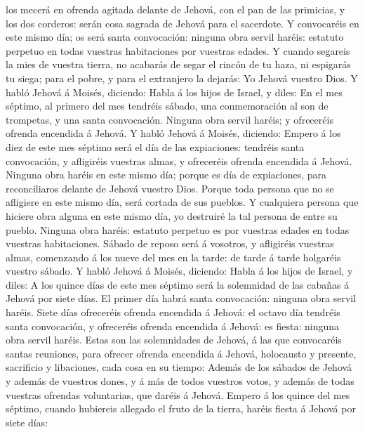 los mecerá en ofrenda agitada delante de Jehová, con el pan de las
primicias, y los dos corderos: serán cosa sagrada de Jehová para el
sacerdote.  Y convocaréis en este mismo día; os será santa
convocación: ninguna obra servil haréis: estatuto perpetuo en todas
vuestras habitaciones por vuestras edades.  Y cuando
segareis la mies de vuestra tierra, no acabarás de segar el rincón de tu
haza, ni espigarás tu siega; para el pobre, y para el extranjero la
dejarás: Yo Jehová vuestro Dios.  Y habló Jehová á Moisés,
diciendo:  Habla á los hijos de Israel, y diles: En el mes
séptimo, al primero del mes tendréis sábado, una conmemoración al son de
trompetas, y una santa convocación.  Ninguna obra servil
haréis; y ofreceréis ofrenda encendida á Jehová.  Y habló
Jehová á Moisés, diciendo:  Empero á los diez de este mes
séptimo será el día de las expiaciones: tendréis santa convocación, y
afligiréis vuestras almas, y ofreceréis ofrenda encendida á Jehová.
 Ninguna obra haréis en este mismo día; porque es día de
expiaciones, para reconciliaros delante de Jehová vuestro Dios.
 Porque toda persona que no se afligiere en este mismo día,
será cortada de sus pueblos.  Y cualquiera persona que
hiciere obra alguna en este mismo día, yo destruiré la tal persona de
entre su pueblo.  Ninguna obra haréis: estatuto perpetuo es
por vuestras edades en todas vuestras habitaciones.  Sábado
de reposo será á vosotros, y afligiréis vuestras almas, comenzando á los
nueve del mes en la tarde: de tarde á tarde holgaréis vuestro sábado.
 Y habló Jehová á Moisés, diciendo:  Habla á
los hijos de Israel, y diles: A los quince días de este mes séptimo será
la solemnidad de las cabañas á Jehová por siete días.  El
primer día habrá santa convocación: ninguna obra servil haréis.
 Siete días ofreceréis ofrenda encendida á Jehová: el
octavo día tendréis santa convocación, y ofreceréis ofrenda encendida á
Jehová: es fiesta: ninguna obra servil haréis.  Estas son
las solemnidades de Jehová, á las que convocaréis santas reuniones, para
ofrecer ofrenda encendida á Jehová, holocausto y presente, sacrificio y
libaciones, cada cosa en su tiempo:  Además de los sábados
de Jehová y además de vuestros dones, y á más de todos vuestros votos, y
además de todas vuestras ofrendas voluntarias, que daréis á Jehová.
 Empero á los quince del mes séptimo, cuando hubiereis
allegado el fruto de la tierra, haréis fiesta á Jehová por siete días:
